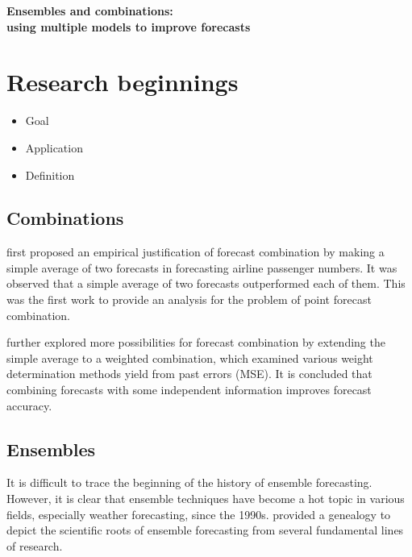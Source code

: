 \documentclass[11pt]{article}
\begin{document}
\def\spacingset#1{\renewcommand{\baselinestretch}%
{#1}\small\normalsize} \spacingset{1}

\begin{center}
{\bf\Large Ensembles and combinations:\\using multiple models to improve forecasts}
\end{center}


\bigskip


\spacingset{1.5} 

\section{Research beginnings}
\begin{itemize}
\item Goal
\item Application
\item Definition
\end{itemize}

\subsection{Combinations}

\cite{Barnard1963-xa} first proposed an empirical justification of forecast combination by making a simple average of two forecasts in forecasting airline passenger numbers. It was observed that a simple average of two forecasts outperformed each of them. This was the first work to provide an analysis for the problem of point forecast combination.

\cite{Bates1969-yj} further explored more possibilities for forecast combination by extending the simple average to a weighted combination, which examined various weight determination methods yield from past errors (MSE). It is concluded that combining forecasts with some independent information improves forecast accuracy.

\subsection{Ensembles}

It is difficult to trace the beginning of the history of ensemble forecasting. However, it is clear that ensemble techniques have become a hot topic in various fields, especially weather forecasting, since the 1990s. \cite{Lewis2005-hu} provided a genealogy to depict the scientific roots of ensemble forecasting from several fundamental lines of research.
\end{document}

